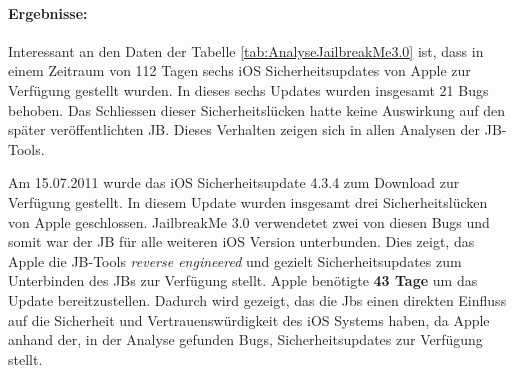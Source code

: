 \paragraph{Ergebnisse:} Interessant an den Daten der Tabelle \ref{tab:AnalyseJailbreakMe3.0} ist, dass in einem Zeitraum von 112 Tagen sechs iOS Sicherheitsupdates von Apple zur Verfügung gestellt wurden. In dieses sechs Updates wurden insgesamt 21 Bugs behoben. Das Schliessen dieser Sicherheitslücken hatte keine Auswirkung auf den später veröffentlichten JB. Dieses Verhalten zeigen sich in allen Analysen der JB-Tools. \par  
Am 15.07.2011 wurde das iOS Sicherheitsupdate 4.3.4 zum Download zur Verfügung gestellt. In diesem Update wurden insgesamt drei Sicherheitslücken von Apple geschlossen. JailbreakMe 3.0 verwendetet zwei von diesen Bugs und somit war der JB für alle weiteren iOS Version unterbunden. Dies zeigt, das Apple die JB-Tools \textit{\glqq reverse engineered\grqq{}} und gezielt Sicherheitsupdates zum Unterbinden des JBs zur Verfügung stellt. Apple benötigte \textbf{43 Tage} um das Update bereitzustellen. Dadurch wird gezeigt, das die Jbs einen direkten Einfluss auf die Sicherheit und Vertrauenswürdigkeit des iOS Systems haben, da Apple anhand der, in der Analyse gefunden Bugs, Sicherheitsupdates zur Verfügung stellt. \par 

